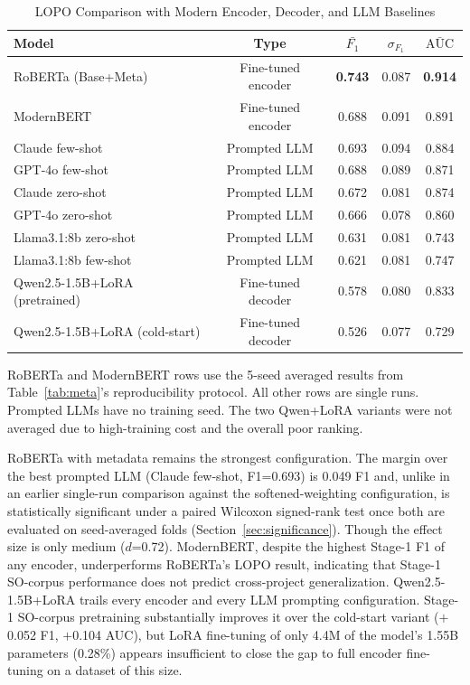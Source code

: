 \documentclass[preprint,12pt]{elsarticle}
\begin{document}
\begin{table}[t]
\centering
\caption{LOPO Comparison with Modern Encoder, Decoder, and LLM Baselines}
\label{tab:llm_baselines}
\setlength{\tabcolsep}{3pt}
\begin{tabular}{lcccc}
\toprule
\textbf{Model} & \textbf{Type} & \textbf{$\bar{F_1}$} & \textbf{$\sigma_{F_1}$} & \textbf{$\bar{\text{AUC}}$} \\
\midrule
RoBERTa (Base+Meta) & Fine-tuned encoder & \textbf{0.743} & 0.087 & \textbf{0.914} \\
ModernBERT & Fine-tuned encoder & 0.688 & 0.091 & 0.891 \\
Claude few-shot & Prompted LLM & 0.693 & 0.094 & 0.884 \\
GPT-4o few-shot & Prompted LLM & 0.688 & 0.089 & 0.871 \\
Claude zero-shot & Prompted LLM & 0.672 & 0.081 & 0.874 \\
GPT-4o zero-shot & Prompted LLM & 0.666 & 0.078 & 0.860 \\
Llama3.1:8b zero-shot & Prompted LLM & 0.631 & 0.081 & 0.743 \\
Llama3.1:8b few-shot & Prompted LLM & 0.621 & 0.081 & 0.747 \\
Qwen2.5-1.5B+LoRA (pretrained) & Fine-tuned decoder & 0.578 & 0.080 & 0.833 \\
Qwen2.5-1.5B+LoRA (cold-start) & Fine-tuned decoder & 0.526 & 0.077 & 0.729 \\
\bottomrule
\end{tabular}
\begin{flushleft}
\footnotesize RoBERTa and ModernBERT rows use the 5-seed averaged results from Table~\ref{tab:meta}'s reproducibility protocol. All other rows are single runs. Prompted LLMs have no training seed. The two Qwen+LoRA variants were not averaged due to high-training cost and the overall poor ranking.
\end{flushleft}
\end{table}

RoBERTa with metadata remains the strongest configuration. The margin over the best prompted LLM (Claude few-shot, F1=0.693) is 0.049 F1 and, unlike in an earlier single-run comparison against the softened-weighting configuration, is statistically significant under a paired Wilcoxon signed-rank test once both are evaluated on seed-averaged folds (Section~\ref{sec:significance}). Though the effect size is only medium ($d$=0.72). ModernBERT, despite the highest Stage-1 F1 of any encoder, underperforms RoBERTa's LOPO result, indicating that Stage-1 SO-corpus performance does not predict cross-project generalization. Qwen2.5-1.5B+LoRA trails every encoder and every LLM prompting configuration. Stage-1 SO-corpus pretraining substantially improves it over the cold-start variant ($+$0.052 F1, $+$0.104 AUC), but LoRA fine-tuning of only 4.4M of the model's 1.55B parameters (0.28\%) appears insufficient to close the gap to full encoder fine-tuning on a dataset of this size.
\end{document}
